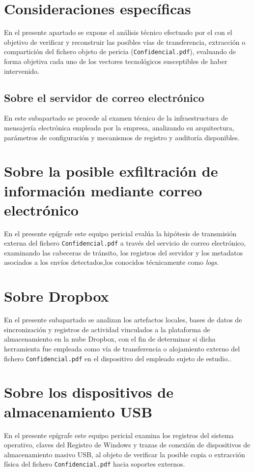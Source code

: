 \section{Consideraciones específicas}
En el presente apartado se expone el análisis técnico efectuado por el \textbf{\GrupoPracticas} con el objetivo de verificar y reconstruir las posibles vías de transferencia, extracción o compartición del fichero objeto de pericia (\texttt{Confidencial.pdf}), evaluando de forma objetiva cada uno de los vectores tecnológicos susceptibles de haber intervenido.

\subsection{Sobre el servidor de correo electrónico}
En este subapartado se procede al examen técnico de la infraestructura de mensajería electrónica empleada por la empresa, analizando su arquitectura, parámetros de configuración y mecanismos de registro y auditoría disponibles.


\section{Sobre la posible exfiltración de información mediante correo electrónico}
En el presente epígrafe este equipo pericial evalúa la hipótesis de transmisión externa del fichero \texttt{Confidencial.pdf} a través del servicio de correo electrónico, examinando las cabeceras de tránsito, los registros del servidor y los metadatos asociados a los envíos detectados,los conocidos técnicamente como \textit{logs}.


\section{Sobre Dropbox}
En el presente subapartado se analizan los artefactos locales, bases de datos de sincronización y registros de actividad vinculados a la plataforma de almacenamiento en la nube Dropbox, con el fin de determinar si dicha herramienta fue empleada como vía de transferencia o alojamiento externo del fichero \texttt{Confidencial.pdf} en el dispositivo del empleado sujeto de estudio..


\section{Sobre los dispositivos de almacenamiento USB}
En el presente epígrafe este equipo pericial examina los registros del sistema operativo, claves del Registro de Windows y trazas de conexión de dispositivos de almacenamiento masivo USB, al objeto de verificar la posible copia o extracción física del fichero \texttt{Confidencial.pdf} hacia soportes externos.
